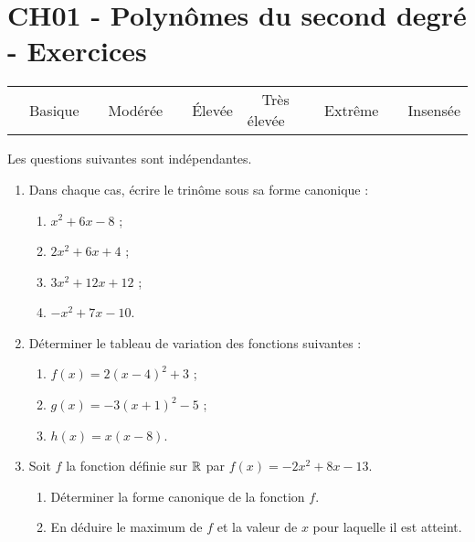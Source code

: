 \documentclass[a4paper,11pt]{article}
\author{Pierquet}
\title{\nomfichier}
\begin{document}
\pagestyle{fancy}

\part{CH01 - Polynômes du second degré - Exercices}

\medskip

\begin{caide}
	{\setlength\arrayrulewidth{1.5pt} 
		\begin{tabularx}{\linewidth}{Y|Y|Y|Y|Y|Y}
			~~\textsf{Basique} & ~~\textsf{Modérée} & ~~\textsf{Élevée} & ~~\textsf{Très élevée} & ~~\textsf{Extrême} & ~~\textsf{Insensée} \\
		\end{tabularx}}
\end{caide}

\medskip


\medskip

Les questions suivantes sont indépendantes.
\begin{enumerate}
	\item Dans chaque cas, écrire le trinôme sous sa forme canonique :
	\begin{enumerate}
		\item $x^2+6x-8$ ;
		\item $2x^2+6x+4$ ;
		\item $3x^2+12x+12$ ;
		\item $-x^2+7x-10$.
	\end{enumerate}
	\item Déterminer le tableau de variation des fonctions suivantes :
	\begin{enumerate}
		\item $f(x)=2(x-4)^2+3$ ;
		\item $g(x)=-3(x+1)^2-5$ ;
		\item $h(x)=x(x-8)$.
	\end{enumerate}
	\item Soit $f$ la fonction définie sur $\R$ par $f(x)=-2x^2+8x-13$.
	\begin{enumerate}
		\item Déterminer la forme canonique de la fonction $f$.
		\item En déduire le maximum de $f$ et la valeur de $x$ pour laquelle il est atteint.
	\end{enumerate}
\end{enumerate}
\end{document}

